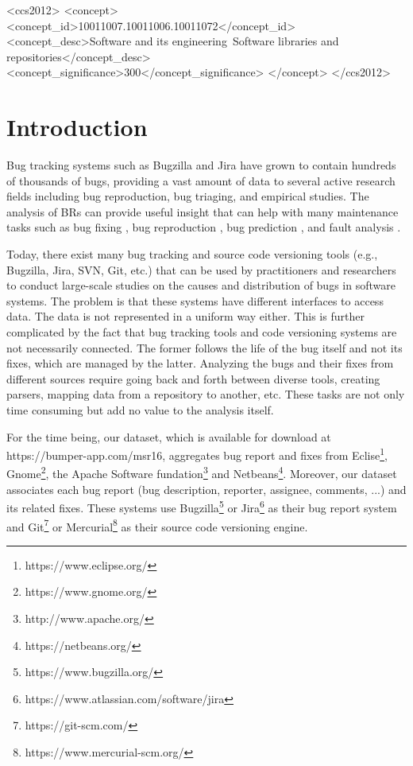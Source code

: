 \documentclass{sig-alternate-05-2015}
\begin{document}
\begin{CCSXML}
<ccs2012>
<concept>
<concept_id>10011007.10011006.10011072</concept_id>
<concept_desc>Software and its engineering~Software libraries and repositories</concept_desc>
<concept_significance>300</concept_significance>
</concept>
</ccs2012>
\end{CCSXML}


\printccsdesc



\section{Introduction}
\label{sec:Introduction}

Bug tracking systems such as Bugzilla and Jira have
grown to contain hundreds of thousands of bugs, providing
a vast amount of data to several active research fields
including bug reproduction, bug triaging, and empirical
studies. The analysis of BRs can provide useful insight that
can help with many maintenance tasks such as bug fixing
\cite{Weiß2007, Bhattacharya2011, Saha2014}, bug reproduction \cite{Artzi2008,Chen2013,Jin2012,Nayrolles2015}, bug prediction \cite{DAmbros2010, Kamei2010, Kim2011a}, and fault analysis \cite{Hamill2014}.

Today, there exist many bug tracking and source code
versioning tools (e.g., Bugzilla, Jira, SVN, Git, etc.) that
can be used by practitioners and researchers to conduct
large-scale studies on the causes and distribution of bugs in
software systems. The problem is that these systems have
different interfaces to access data. The data is not
represented in a uniform way either. This is further
complicated by the fact that bug tracking tools and code
versioning systems are not necessarily connected. The
former follows the life of the bug itself and not its fixes,
which are managed by the latter.
Analyzing the bugs and their fixes from different
sources require going back and forth between diverse tools,
creating parsers, mapping data from a repository to another,
etc. These tasks are not only time consuming but add no
value to the analysis itself.

For the time being, our dataset, which is available for download at
https://bumper-app.com/msr16, aggregates bug report and fixes from
Eclise\footnote{https://www.eclipse.org/}, Gnome\footnote{https://www.gnome.org/}, the Apache Software fundation\footnote{http://www.apache.org/} and Netbeans\footnote{https://netbeans.org/}.
Moreover, our dataset associates each bug report (bug description, reporter, assignee, comments, ...) and its related fixes.
These systems use Bugzilla\footnote{https://www.bugzilla.org/} or Jira\footnote{https://www.atlassian.com/software/jira} as their bug report system and Git\footnote{https://git-scm.com/} or Mercurial\footnote{https://www.mercurial-scm.org/} as their source code versioning engine.
\end{document}
